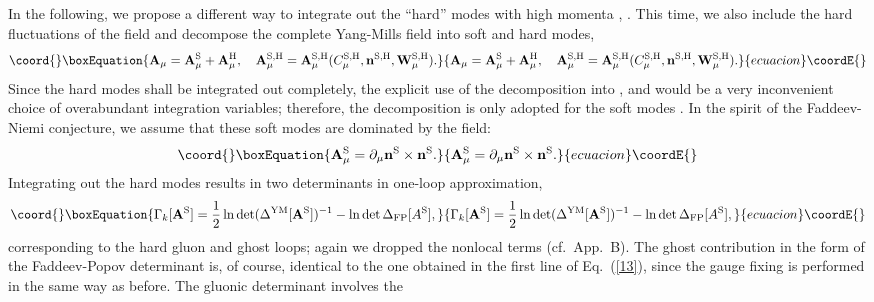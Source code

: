 \documentclass[a4paper,12pt]{article}
\providecommand{\re}[1]{~(\ref{#1})}\usepackage{useful_macros}
\begin{document}
In the following, we propose a different way to integrate out the
``hard'' modes with high momenta \coordHE{}, \coordHE{}. This time, we
also include the hard fluctuations of the \myHighlight{$\mn$}\coordHE{} field and decompose
the complete Yang-Mills field into soft and hard modes,
\begin{equation}\coord{}\boxEquation{
\mA_\mu=\mA^{\text{S}}_\mu +\mA^{\text{H}}_\mu, \quad 
\mA^{\text{S,H}}_\mu=\mA^{\text{S,H}}_\mu 
(C^{\text{S,H}}_\mu,\mn^{\text{S,H}},\mW^{\text{S,H}}_\mu). \label{17}
}{
\mA_\mu=\mA^{\text{S}}_\mu +\mA^{\text{H}}_\mu, \quad 
\mA^{\text{S,H}}_\mu=\mA^{\text{S,H}}_\mu 
(C^{\text{S,H}}_\mu,\mn^{\text{S,H}},\mW^{\text{S,H}}_\mu). }{ecuacion}\coordE{}\end{equation}
Since the hard modes \coordHE{} shall be integrated out
completely, the explicit use of the decomposition into
\coordHE{}, \coordHE{} and \coordHE{} would be
a very inconvenient choice of overabundant integration
variables; therefore, the decomposition is only adopted for the soft
modes \coordHE{}. In the spirit of the Faddeev-Niemi
conjecture, we assume that these soft modes are dominated by the \myHighlight{$\mn$}\coordHE{}
field:
\begin{equation}\coord{}\boxEquation{
\mA^{\text{S}}_\mu =\partial_\mu\mn^{\text{S}}\times
\mn^{\text{S}}. \label{18}
}{
\mA^{\text{S}}_\mu =\partial_\mu\mn^{\text{S}}\times
\mn^{\text{S}}. }{ecuacion}\coordE{}\end{equation}
Integrating out the hard modes \coordHE{} results in two
determinants in one-loop approximation,
\begin{equation}\coord{}\boxEquation{
\Gamma_k[\mA^{\text{S}}] =\frac{1}{2} \ln \det
(\Delta^{\text{YM}}[\mA^{\text{S}}])^{-1} 
-\ln\det\Delta_{\text{FP}}[A^{\text{S}}], \label{19}
}{
\Gamma_k[\mA^{\text{S}}] =\frac{1}{2} \ln \det
(\Delta^{\text{YM}}[\mA^{\text{S}}])^{-1} 
-\ln\det\Delta_{\text{FP}}[A^{\text{S}}], }{ecuacion}\coordE{}\end{equation}
corresponding to the hard gluon and ghost loops; again we dropped the
nonlocal terms (cf.~App.~B). The ghost contribution in the form of the
Faddeev-Popov determinant is, of course, identical to the one obtained
in the first line of Eq.\re{13}, since the gauge fixing is performed
in the same way as before. The gluonic determinant involves the
\end{document}
